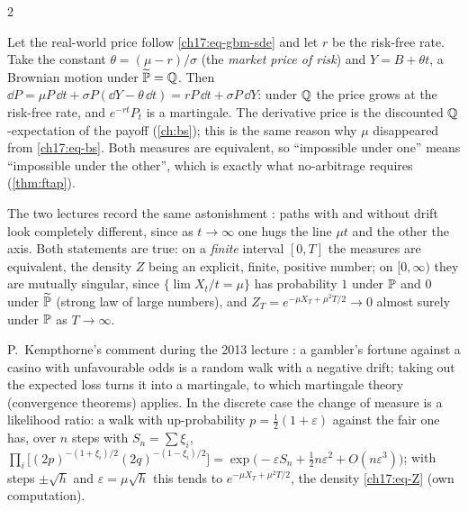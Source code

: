 \begin{paracol}{2}
\begin{finance}
Let the real-world price follow \eqref{ch17:eq-gbm-sde} and let $r$ be the risk-free rate. Take the constant $\theta=(\mu-r)/\sigma$ (the \emph{market price of risk}) and $Y=B+\theta t$, a Brownian motion under $\widetilde{\mathbb{P}}=\mathbb{Q}$. Then
$\dd P=\mu P\,\dd t+\sigma P(\dd Y-\theta\,\dd t)=rP\,\dd t+\sigma P\,\dd Y$: under $\mathbb{Q}$ the price grows at the risk-free rate, and $e^{-rt}P_t$ is a martingale. The derivative price is the discounted $\mathbb{Q}$-expectation of the payoff (\cref{ch:bs});
this is the same reason why $\mu$ disappeared from \eqref{ch17:eq-bs}. Both measures are equivalent, so ``impossible under one'' means ``impossible under the other'', which is exactly what no-arbitrage requires (\cref{thm:ftap}).
\end{finance}

\begin{remark}
The two lectures record the same astonishment : paths with and without drift look completely different, since as $t\to\infty$ one hugs the line $\mu t$ and the other the axis. Both statements are true: on a \emph{finite} interval $[0,T]$ the measures are equivalent, the density $Z$ being an
explicit, finite, positive number; on $[0,\infty)$ they are mutually singular, since $\{\lim X_t/t=\mu\}$ has probability $1$ under $\mathbb{P}$ and $0$ under $\widetilde{\mathbb{P}}$ (strong law of large numbers), and $Z_T=e^{-\mu X_T+\mu^2T/2}\to0$ almost surely under $\mathbb{P}$ as $T\to\infty$.
\end{remark}

\begin{remark}
P.~Kempthorne's comment during the 2013 lecture : a gambler's fortune against a casino with unfavourable odds is a random walk with a negative drift; taking out the expected loss turns it into a martingale, to which martingale theory (convergence theorems) applies. In the discrete case the change of measure is a likelihood ratio: a
walk with up-probability $p=\tfrac12(1+\varepsilon)$ against the fair one has, over $n$ steps with $S_n=\sum\xi_i$, $\prod_i\bigl[(2p)^{-(1+\xi_i)/2}(2q)^{-(1-\xi_i)/2}\bigr]=\exp\bigl(-\varepsilon S_n+\tfrac12n\varepsilon^2+O(n\varepsilon^3)\bigr)$;
with steps $\pm\sqrt h$ and $\varepsilon=\mu\sqrt h$ this tends to $e^{-\mu X_T+\mu^2T/2}$, the density \eqref{ch17:eq-Z} (own computation).
\end{remark}


\end{paracol}

